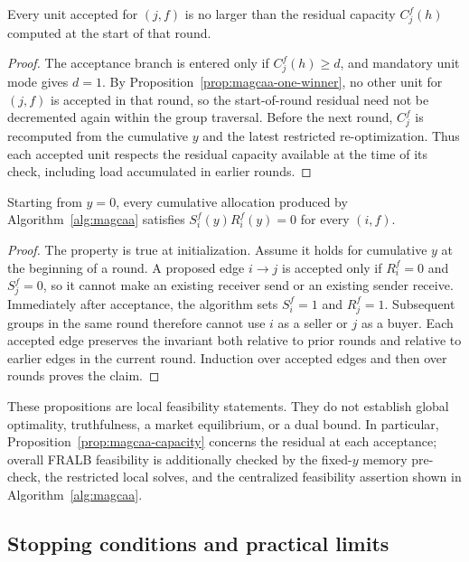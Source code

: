 \begin{proposition}
\label{prop:magcaa-capacity}
Every unit accepted for $(j,f)$ is no larger than the residual capacity
$C_j^f(h)$ computed at the start of that round.
\end{proposition}
\begin{proof}
The acceptance branch is entered only if $C_j^f(h)\ge d$, and mandatory
unit mode gives $d=1$. By Proposition~\ref{prop:magcaa-one-winner}, no other
unit for $(j,f)$ is accepted in that round, so the start-of-round residual
need not be decremented again within the group traversal. Before the next
round, $C_j^f$ is recomputed from the cumulative $y$ and the latest
restricted re-optimization. Thus each accepted unit respects the residual
capacity available at the time of its check, including load accumulated in
earlier rounds.
\end{proof}

\begin{proposition}
\label{prop:magcaa-no-ping-pong}
Starting from $y=0$, every cumulative allocation produced by
Algorithm~\ref{alg:magcaa} satisfies
$S_i^f(y)R_i^f(y)=0$ for every $(i,f)$.
\end{proposition}
\begin{proof}
The property is true at initialization. Assume it holds for cumulative $y$
at the beginning of a round. A proposed edge $i\to j$ is accepted only if
$R_i^f=0$ and $S_j^f=0$, so it cannot make an existing receiver send or an
existing sender receive. Immediately after acceptance, the algorithm sets
$S_i^f=1$ and $R_j^f=1$. Subsequent groups in the same round therefore
cannot use $i$ as a seller or $j$ as a buyer. Each accepted edge preserves
the invariant both relative to prior rounds and relative to earlier edges
in the current round. Induction over accepted edges and then over rounds
proves the claim.
\end{proof}

These propositions are local feasibility statements. They do not establish
global optimality, truthfulness, a market equilibrium, or a dual bound. In
particular, Proposition~\ref{prop:magcaa-capacity} concerns the residual at
each acceptance; overall FRALB feasibility is additionally checked by the
fixed-$y$ memory pre-check, the restricted local solves, and the centralized
feasibility assertion shown in Algorithm~\ref{alg:magcaa}.

\subsection{Stopping conditions and practical limits}
\label{sec:magcaa-stopping}

